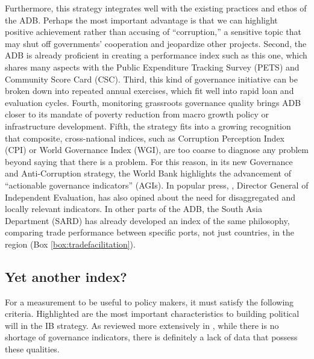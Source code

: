 \documentclass[12pt]{article}
\begin{document}
Furthermore, this strategy integrates well with the existing practices and ethos of the ADB. Perhaps the most important advantage is that we can highlight positive achievement rather than accusing of ``corruption,'' a sensitive topic that may shut off governments' cooperation and jeopardize other projects. Second, the ADB is already proficient in creating a performance index such as this one, which shares many aspects with the Public Expenditure Tracking Survey (PETS) and Community Score Card (CSC). Third, this kind of governance initiative can be broken down into repeated annual exercises, which fit well into rapid loan and evaluation cycles. Fourth, monitoring grassroots governance quality brings ADB closer to its mandate of poverty reduction from macro growth policy or infrastructure development. Fifth, the strategy fits into a growing recognition that composite, cross-national indices, such as Corruption Perception Index (CPI) or World Governance Index (WGI), are too coarse to diagnose any problem beyond saying that there is a problem. For this reason, in its new Governance and Anti-Corruption strategy, the World Bank highlights the advancement of ``actionable governance indicators'' (AGIs). In popular press, \citet{Thomas2013}, Director General of Independent Evaluation, has also opined about the need for disaggregated and locally relevant indicators.  In other parts of the ADB, the South Asia Department (SARD) has already developed an index of the same philosophy, comparing trade performance between specific ports, not just countries, in the region (Box \ref{box:tradefacilitation}).

\subsection{Yet another index?} \label{sec:anotherindex}
For a measurement to be useful to policy makers, it must satisfy the following criteria. Highlighted are the most important characteristics to building political will in the IB strategy. As reviewed more extensively in \citet{Pande2013}, while there is no shortage of governance indicators, there is definitely a lack of data that possess these qualities.
\end{document}

